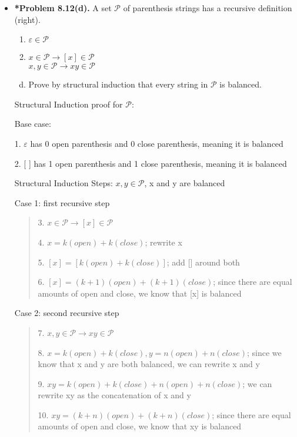 \documentclass[11pt]{article}
\def\imp{\rightarrow}
\begin{document}
\begin{itemize}
\vspace{0.1in}

\item \textbf{*Problem 8.12(d).}
A set $\mathcal{P}$ of parenthesis strings has a recursive definition (right).
\begin{enumerate}[(1)]
\item $\varepsilon\in\mathcal{P}$
\item $x\in\mathcal{P}\imp [x]\in\mathcal{P}$ \\
  $x,y\in\mathcal{P}\imp xy\in\mathcal{P}$
\end{enumerate}
\begin{enumerate}[(a)]
\setcounter{enumi}{3}
\item Prove by structural induction that every string in $\mathcal{P}$ is balanced.
\end{enumerate}

\begin{center}
  Structural Induction proof for $\mathcal{P}$:
\end{center}

Base case:

1. $\varepsilon$ has 0 open parenthesis and 0 close parenthesis, meaning it is balanced

2.  [ ] has 1 open parenthesis and 1 close parenthesis, meaning it is balanced

Structural Induction Steps: $x, y \in \mathcal{P} $, x and y are balanced

Case 1: first recursive step
\begin{quote}
3. $x \in \mathcal{P} \xrightarrow{} [x] \in \mathcal{P}$

4. $x = k(open) + k(close)$; rewrite x

5. $[x] = [k(open) + k(close)]$; add [] around both

6. $[x] = (k+1)(open) + (k+1)(close)$; since there are equal amounts of open and close, we know that [x] is balanced
\end{quote}

Case 2: second recursive step
\begin{quote}
7. $x, y \in \mathcal{P} \xrightarrow{} xy \in \mathcal{P}$

8. $x = k(open) + k(close), y = n(open) + n(close)$; since we know that x and y are both balanced, we can rewrite x and y

9. $xy = k(open) + k(close) + n(open) + n(close)$; we can rewrite xy as the concatenation of x and y

10. $xy = (k+n)(open) + (k+n)(close)$; since there are equal amounts of open and close, we know that xy is balanced 
\end{quote}


\end{itemize}
\end{document}
